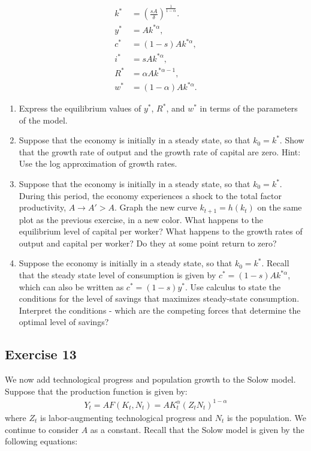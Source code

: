 \documentclass[11pt]{article}
\begin{document}
\begin{align*}
    k^* &= \left(\frac{sA}{\delta}\right)^{\frac{1}{1-\alpha}}. \\
    y^* &= Ak^{* \alpha}, \\
    c^* &= (1 - s)Ak^{* \alpha}, \\
    i^* &= sAk^{* \alpha}, \\
    R^* &= \alpha Ak^{* \alpha - 1}, \\
    w^* &= (1 - \alpha) Ak^{* \alpha}.
\end{align*}

\begin{enumerate}
    \item Express the equilibrium values of \(y^*\), \(R^*\), and \(w^*\) in terms of the
    parameters of the model.
    \item Suppose that the economy is initially in a steady state, so that \(k_0 = k^*\).
    Show that the growth rate of output and the growth rate of capital are zero.
    Hint: Use the log approximation of growth rates.
    \item Suppose that the economy is initially in a steady state, so that \(k_0 = k^*\).
    During this period, the economy experiences a shock to the total factor productivity,  
    \(A \to A' > A\). 
    Graph the new curve \(k_{t+1} = h(k_t)\) on the same plot as the previous exercise,
    in a new color. What happens to the equilibrium level of capital per worker?
    What happens to the growth rates of output and capital per worker?
    Do they at some point return to zero?
    \item Suppose the economy is initially in a steady state, so that \(k_0 = k^*\).
    Recall that the steady state level of consumption is given by \(c^* = (1 - s)Ak^{* \alpha}\),
    which can also be written as \(c^* = (1 - s)y^*\).
    Use calculus to state the conditions for the level of savings that maximizes steady-state consumption.
    Interpret the conditions - which are the competing forces that determine the optimal level of savings?
\end{enumerate}

\subsection*{Exercise 13}
We now add technological progress and population growth to the Solow model.
Suppose that the production function is given by:
\begin{align*}
    Y_t =AF(K_t,N_t)= A K_t^{\alpha} (Z_t N_t)^{1-\alpha}
\end{align*}
where \(Z_t\) is labor-augmenting technological progress and \(N_t\) is the population. 
We continue to consider \(A\) as a constant.
Recall that the Solow model is given by the following equations:
\end{document}
